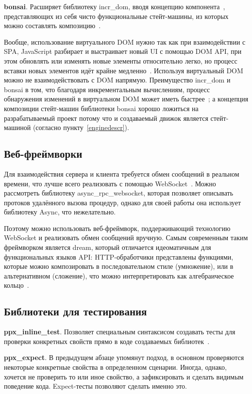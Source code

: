 \textbf{bonsai}. Расширяет библиотеку incr\_dom, вводя концепцию компонента~\cite{bonsai-history},
представляющих из себя чисто функциональные стейт-машины, из которых можно составлять композицию~\cite{janestreet-bonsai}.

Вообще, использование виртуального DOM нужно так как при взаимодействии с SPA, JavaScript разбирает и выстраивает новый UI
с помощью DOM API, при этом обновлять или изменять новые элементы относительно легко, но процесс вставки новых элементов
идёт крайне медленно~\cite[с.~72]{react-book}. Используя виртуальный DOM можно не взаимодействовать с DOM напрямую.
Преимущество incr\_dom и bonsai в том, что благодаря инкрементальным вычислениям, процесс обнаружения изменений в
виртуальном DOM может иметь быстрее~\cite{minsky-incrdom};
а концепция композиции стейт-машин библиотеки bonsai хорошо ложиться на
разрабатываемый проект потому что и создаваемый движок является стейт-машиной (согласно пункту~\ref{enginedescr}).

\subsection{Веб-фреймворки}

Для взаимодействия сервера и клиента требуется обмен сообщений в реальном времени, что лучше всего реализовать
с помощью WebSocket~\cite{mdn-websocket}. Можно рассмотреть библиотеку async\_rpc\_websocket,
которая позволяет описывать протоков удалённого вызова процедур, однако
для своей работы она использует библиотеку Async, что нежелательно.

Поэтому можно использовать веб-фреймворк, поддерживающий технологию WebSocket и реализовать обмен сообщений вручную.
Самым современным таким фреймворком является dream, который отличается идеоматичным для функциональных языков API:
HTTP-обработчики представлены функциями, которые можно композировать в последовательном стиле (умножение),
или в альтернативном (сложение), что можно интерпретировать как алгебраическое кольцо~\cite{dream}.

\subsection{Библиотеки для тестирования}

\textbf{ppx\_inline\_test}. Позволяет специальным синтаксисом создавать тесты
для проверки конкретных свойств
прямо в коде создаваемых библиотек~\cite{rwo-testing}.

\textbf{ppx\_expect}. В предыдущем абзаце упомянут подход, в основном проверяются некоторые конкретные
свойства в определенном сценарии. Иногда, однако, хочется не проверить то или иное свойство, а зафиксировать
и сделать видимым поведение кода. Expect-тесты позволяют сделать именно это.~\cite{rwo-testing}

